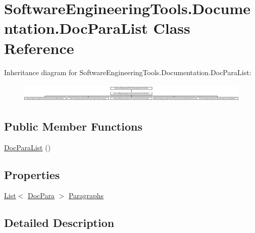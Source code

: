 \hypertarget{class_software_engineering_tools_1_1_documentation_1_1_doc_para_list}{\section{Software\+Engineering\+Tools.\+Documentation.\+Doc\+Para\+List Class Reference}
\label{class_software_engineering_tools_1_1_documentation_1_1_doc_para_list}
}
Inheritance diagram for Software\+Engineering\+Tools.\+Documentation.\+Doc\+Para\+List\+:\begin{figure}[H]
\begin{center}
\leavevmode
\includegraphics[height=0.918033cm]{class_software_engineering_tools_1_1_documentation_1_1_doc_para_list}
\end{center}
\end{figure}
\subsection*{Public Member Functions}
\begin{DoxyCompactItemize}
\item 
\hyperlink{class_software_engineering_tools_1_1_documentation_1_1_doc_para_list_ad8dbbcf2c31cb83c1d32bda88f3aebe4}{Doc\+Para\+List} ()
\end{DoxyCompactItemize}
\subsection*{Properties}
\begin{DoxyCompactItemize}
\item 
\hyperlink{namespace_software_engineering_tools_1_1_documentation_ae0bccf4f49a76db084c1c316e5954ec9a4ee29ca12c7d126654bd0e5275de6135}{List}$<$ \hyperlink{class_software_engineering_tools_1_1_documentation_1_1_doc_para}{Doc\+Para} $>$ \hyperlink{class_software_engineering_tools_1_1_documentation_1_1_doc_para_list_a0758f3ee3b3bb618b24c793d66c00c3a}{Paragraphs}
\end{DoxyCompactItemize}


\subsection{Detailed Description}


